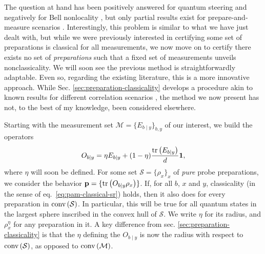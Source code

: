         The question at hand has been positively answered for quantum steering \cite{quintino_incompatibilitysteering_2014,uola_incompatibilitysteering_2014,uola_onetoonesteering_2015} and negatively for Bell nonlocality \cite{quintino_2016_incompatibilitybell,quintino_2018_incompatibilitybellgeneral,bene_2018_incompatibilitybell}, but only partial results exist for prepare-and-measure scenarios \cite{carmeli_racsincompatibility_2020}. Interestingly, this problem is similar to what we have just dealt with, but while we were previously interested in certifying some set of preparations is classical for all measurements, we now move on to certify there exists no set of \emph{preparations} such that a fixed set of measurements unveils nonclassicality. We will soon see the previous method is straightforwardly adaptable. Even so, regarding the existing literature, this is a more innovative approach. While Sec. \ref{sec:preparation-classicality} develops a procedure akin to known results for different correlation scenarios \cite{cavalcanti_generalmethod_2016,hirsch_algorithmic_2016}, the method we now present has not, to the best of my knowledge, been considered elsewhere.

        \ornamentbreak

        Starting with the measurement set $\mathcal{M} = \{ E_{b \mid y} \}_{b,y}$ of our interest, we build the operators
        \begin{equation}
            O_{b \mid y} = \eta E_{b \mid y} + (1 - \eta)\frac{\text{tr}\left( E_{b \mid y} \right)}{d} \mathbf{1} ,
        \label{eq:polarized-measurements}
        \end{equation}
        where $\eta$ will soon be defined. For some set $\mathcal{S} = \{ \rho_x \}_x$ of \emph{pure} probe preparations, we consider the behavior $\mathbf{p} = \{ \text{tr}\left( O_{b \mid y} \rho_x  \right) \}$. If, for all $b$, $x$ and $y$, classicality (in the sense of eq.~\eqref{eq:pam-classical-sr}) holds, then it also does for every preparation in $\text{conv} \left( \mathcal{S} \right)$. In particular, this will be true for all quantum states in the largest sphere inscribed in the convex hull of $\mathcal{S}$. We write $\eta$ for its radius, and $\rho_x^\eta$ for any preparation in it. A key difference from sec. \ref{sec:preparation-classicality} is that the $\eta$ defining the $O_{b \mid y}$ is now the radius with respect to $\text{conv} \left( \mathcal{S} \right)$, as opposed to $\text{conv} \left( \mathcal{M} \right)$.


